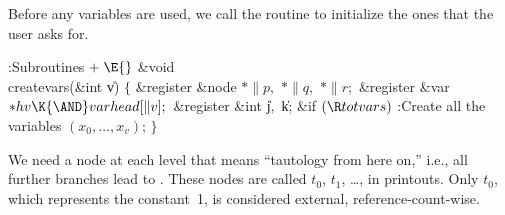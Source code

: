 Before any variables are used, we call the  routine
to initialize the ones that the user asks for.

\Y\B\4:Subroutines\X${}\mathrel+\E{}$\6
\&{void} \\{createvars}(\&{int} \|v)\1\1\2\2\6
${}\{{}$\1\6
\&{register} \&{node} ${}{*}\|p,{}$ ${}{*}\|q,{}$ ${}{*}\|r;{}$\6
\&{register} \&{var} ${}{*}\\{hv}\K{\AND}\\{varhead}[\|v];{}$\6
\&{register} \&{int} \|j${},{}$ \|k;\7
\&{if} ${}(\R\\{totvars}){}$\1\5
:Create all the variables $(x_0,\ldots,x_v)$\X;\2\6
\4${}\}{}$\2\par
\fi

We need a node at each level that means ``tautology from here on,''
i.e., all further branches lead to . These nodes are called
$t_0$, $t_1$, \dots, in printouts. Only $t_0$, which represents the
constant~1, is considered external, reference-count-wise.

